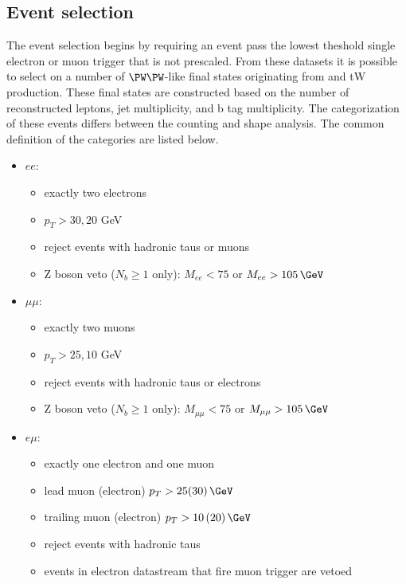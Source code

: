 \subsection{Event selection}
\label{sec:event}

The event selection begins by requiring an event pass the lowest
\pt theshold single electron or muon trigger that is not prescaled.
From these datasets it is possible to select on a number of $\PW\PW$-like
final states originating from \ttbar and tW production.  These final
states are constructed based on the number of reconstructed leptons,
jet multiplicity, and b tag multiplicity.  The categorization of these
events differs between the counting and shape analysis.  The common
definition of the categories are listed below.

\begin{itemize}
    \item $ee$:
    \begin{itemize}
        \item exactly two electrons
        \item $p_{T} > 30, 20$ GeV
        \item reject events with hadronic taus or muons
        \item Z boson veto ($N_{b} \geq 1$ only): $M_{ee} < 75$ or $M_{ee} > 105\,\GeV$
    \end{itemize}
    \item $\mu\mu$:
    \begin{itemize}
        \item exactly two muons
        \item $p_{T} > 25, 10$ GeV
        \item reject events with hadronic taus or electrons
        \item Z boson veto ($N_{b} \geq 1$ only): $M_{\mu\mu} < 75$ or $M_{\mu\mu} > 105\,\GeV$
    \end{itemize}
    \item $e\mu$:
    \begin{itemize}
        \item exactly one electron and one muon
        \item lead muon (electron) $p_{T} > 25 (30)\,\GeV$
        \item trailing muon (electron) $p_{T} > 10\,(20)\,\GeV$
        \item reject events with hadronic taus 
        \item events in electron datastream that fire muon trigger are vetoed

\end{itemize}
\end{itemize}
